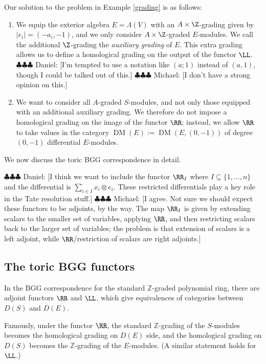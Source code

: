 \documentclass[12pt]{amsart}
\theoremstyle{definition}
\theoremstyle{remark}
\newcommand{\ZZ}{\mathbb Z}
\newcommand{\daniel}[1]{{\color{blue} \sf $\clubsuit\clubsuit\clubsuit$ Daniel: [#1]}}
\newcommand{\michael}[1]{{\color{red} \sf $\clubsuit\clubsuit\clubsuit$ Michael: [#1]}}
\def\DM{\operatorname{DM}}
\begin{document}
Our solution to the problem in Example \ref{grading} is as follows:
\begin{enumerate}
\item We equip the exterior algebra $E = \Lambda(V)$ with an $A \times \Z$-grading given by $|e_i| = (-a_i, -1)$, and we only consider $A \times \Z$-graded $E$-modules. We call the additional $\Z$-grading the \emph{auxiliary grading} of $E$. This extra grading allows us to define a homological grading on the output of the functor $\LL$. \daniel{I'm tempted to use a notation like $(a;1)$ instead of $(a,1)$, though I could be talked out of this.} \michael{I don't have a strong opinion on this.}
\item We want to consider all $A$-graded $S$-modules, and not only those equipped with an additional auxiliary grading. We therefore do not impose a homological grading on the image of the functor $\RR$; instead, we allow $\RR$ to take values in the category $\DM(E) := \DM(E , (0, -1))$ of degree $(0, -1)$ differential $E$-modules.
\end{enumerate}

We now discuss the toric BGG correspondence in detail.


\daniel{I think we want to include the functor $\RR_I$ where $I\subseteq \{1, \dots, n\}$ and the differential is $\sum_{i\in I} x_i\otimes e_i$.  These restricted differentials play a key role in the Tate resolution stuff.} \michael{I agree. Not sure we should expect these functors to be adjoints, by the way. The map $\RR_I$ is given by extending scalars to the smaller set of variables, applying $\RR$, and then restricting scalars back to the larger set of variables; the problem is that extension of scalars is a left adjoint, while $\RR$/restriction of scalars are right adjoints.}
\subsection{The toric BGG functors}
\iffalse
In the BGG correspondence for the standard $\ZZ$-graded polynomial ring, there are adjoint functors $\RR$ and $\LL$, which give equivalences of categories between $D(S)$ and $D(E)$.  

Famously, under the functor $\RR$,  the standard $\ZZ$-grading of the $S$-modules becomes the homological grading on $D(E)$ side, and the homological grading on $D(S)$ becomes the $\ZZ$-grading of the $E$-modules.  (A similar statement holds for $\LL$.)
\end{document}

